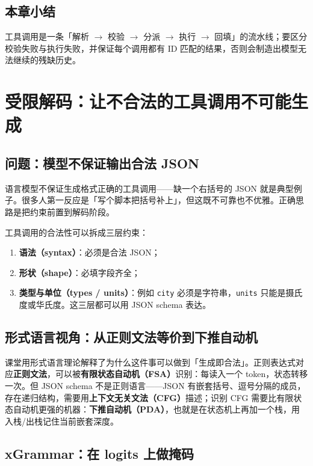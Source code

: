 \documentclass[a4paper]{article}
\begin{document}
\subsection{本章小结}
工具调用是一条「解析 $\rightarrow$ 校验 $\rightarrow$ 分派 $\rightarrow$ 执行 $\rightarrow$ 回填」的流水线；要区分校验失败与执行失败，并保证每个调用都有 ID 匹配的结果，否则会制造出模型无法继续的残缺历史。

\section{受限解码：让不合法的工具调用不可能生成}

\subsection{问题：模型不保证输出合法 JSON}

语言模型不保证生成格式正确的工具调用——缺一个右括号的 JSON 就是典型例子。很多人第一反应是「写个脚本把括号补上」，但这既不可靠也不优雅。正确思路是把约束前置到解码阶段。

工具调用的合法性可以拆成三层约束：

\begin{enumerate}
\item \textbf{语法（syntax）}：必须是合法 JSON；
\item \textbf{形状（shape）}：必填字段齐全；
\item \textbf{类型与单位（types / units）}：例如 \texttt{city} 必须是字符串，\texttt{units} 只能是摄氏度或华氏度。这三层都可以用 JSON schema 表达。
\end{enumerate}

\subsection{形式语言视角：从正则文法等价到下推自动机}

课堂用形式语言理论解释了为什么这件事可以做到「生成即合法」。正则表达式对应\textbf{正则文法}，可以被\textbf{有限状态自动机（FSA）}识别：每读入一个 token，状态转移一次。但 JSON schema 不是正则语言——JSON 有嵌套括号、逗号分隔的成员，存在递归结构，需要用\textbf{上下文无关文法（CFG）}描述；识别 CFG 需要比有限状态自动机更强的机器：\textbf{下推自动机（PDA）}，也就是在状态机上再加一个栈，用入栈/出栈记住当前嵌套深度。

\subsection{xGrammar：在 logits 上做掩码}
\end{document}
